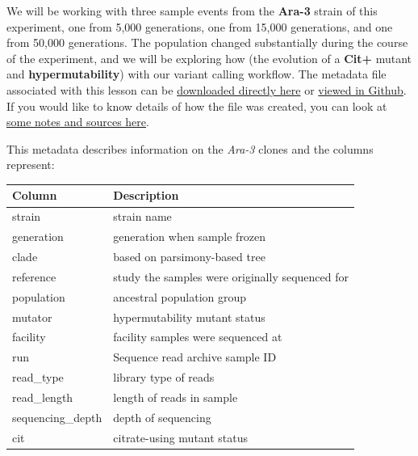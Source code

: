 \documentclass[
  letterpaper,
  DIV=11,
  numbers=noendperiod]{scrreprt}
\begin{document}
We will be working with three sample events from the \textbf{Ara-3}
strain of this experiment, one from 5,000 generations, one from 15,000
generations, and one from 50,000 generations. The population changed
substantially during the course of the experiment, and we will be
exploring how (the evolution of a \textbf{Cit+} mutant and
\textbf{hypermutability}) with our variant calling workflow. The
metadata file associated with this lesson can be
\href{https://raw.githubusercontent.com/datacarpentry/wrangling-genomics/gh-pages/files/Ecoli_metadata_composite.csv}{downloaded
directly here} or
\href{https://github.com/datacarpentry/wrangling-genomics/blob/gh-pages/files/Ecoli_metadata_composite.csv}{viewed
in Github}. If you would like to know details of how the file was
created, you can look at
\href{https://github.com/datacarpentry/wrangling-genomics/blob/gh-pages/files/Ecoli_metadata_composite_README.md}{some
notes and sources here}.

This metadata describes information on the \emph{Ara-3} clones and the
columns represent:

\begin{longtable}[]{@{}ll@{}}
\toprule\noalign{}
Column & Description \\
\midrule\noalign{}
\endhead
\bottomrule\noalign{}
\endlastfoot
strain & strain name \\
generation & generation when sample frozen \\
clade & based on parsimony-based tree \\
reference & study the samples were originally sequenced for \\
population & ancestral population group \\
mutator & hypermutability mutant status \\
facility & facility samples were sequenced at \\
run & Sequence read archive sample ID \\
read\_type & library type of reads \\
read\_length & length of reads in sample \\
sequencing\_depth & depth of sequencing \\
cit & citrate-using mutant status \\
\end{longtable}
\end{document}
